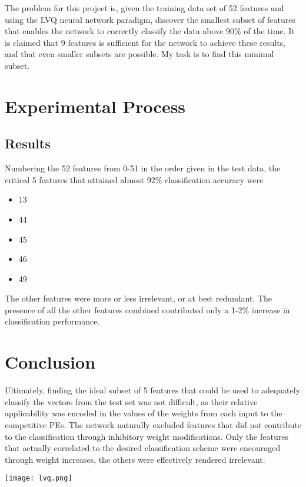 \documentclass[12pt]{article}
\begin{document}
The problem for this project is, given the training data set of 52 features and using the LVQ neural network paradigm, discover the smallest subset of features that enables the network to correctly classify the data above 90\% of the time.  It is claimed that 9 features is sufficient for the network to achieve these results, and that even smaller subsets are possible.  My task is to find this minimal subset.

\section{Experimental Process}



\subsection{Results}

Numbering the 52 features from 0-51 in the order given in the test data, the critical 5 features that attained almost 92\% classification accuracy were

\begin{itemize}
\item 13
\item 44
\item 45
\item 46
\item 49
\end{itemize}

The other features were more or less irrelevant, or at best redundant.  The presence of all the other features combined contributed only a 1-2\% increase in classification performance.

\section{Conclusion}

Ultimately, finding the ideal subset of 5 features that could be used to adequately classify the vectors from the test set was not difficult, as their relative applicability was encoded in the values of the weights from each input to the competitive PEs.  The network naturally excluded features that did not contribute to the classification through inhibitory weight modifications.  Only the features that actually correlated to the desired classification scheme were encouraged through weight increases, the others were effectively rendered irrelevant.  

\begin{center}
\texttt{[image: lvq.png]}
\end{center}
\end{document}

